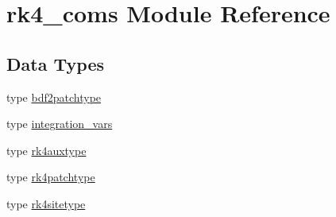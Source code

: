 \hypertarget{namespacerk4__coms}{}\section{rk4\+\_\+coms Module Reference}
\label{namespacerk4__coms}
\subsection*{Data Types}
\begin{DoxyCompactItemize}
\item 
type \hyperlink{structrk4__coms_1_1bdf2patchtype}{bdf2patchtype}
\item 
type \hyperlink{structrk4__coms_1_1integration__vars}{integration\+\_\+vars}
\item 
type \hyperlink{structrk4__coms_1_1rk4auxtype}{rk4auxtype}
\item 
type \hyperlink{structrk4__coms_1_1rk4patchtype}{rk4patchtype}
\item 
type \hyperlink{structrk4__coms_1_1rk4sitetype}{rk4sitetype}
\end{DoxyCompactItemize}
